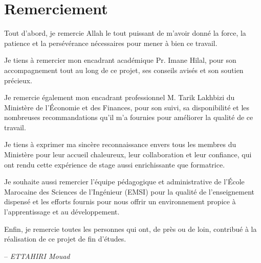 \chapter*{Remerciement}
\adjustmtc
\thispagestyle{MyStyle}

Tout d'abord, je remercie Allah le tout puissant de m'avoir donné la force, la patience et la persévérance nécessaires pour mener à bien ce travail.

Je tiens à remercier mon encadrant académique Pr. Imane Hilal, pour son accompagnement tout au long de ce projet, ses conseils avisés et son soutien précieux.

Je remercie également mon encadrant professionnel M. Tarik Lakhbizi du Ministère de l'Économie et des Finances, pour son suivi, sa disponibilité et les nombreuses recommandations qu'il m'a fournies pour améliorer la qualité de ce travail.

Je tiens à exprimer ma sincère reconnaissance envers tous les membres du Ministère pour leur accueil chaleureux, leur collaboration et leur confiance, qui ont rendu cette expérience de stage aussi enrichissante que formatrice.

Je souhaite aussi remercier l'équipe pédagogique et administrative de l'École Marocaine des Sciences de l'Ingénieur (EMSI) pour la qualité de l'enseignement dispensé et les efforts fournis pour nous offrir un environnement propice à l'apprentissage et au développement.

Enfin, je remercie toutes les personnes qui ont, de près ou de loin, contribué à la réalisation de ce projet de fin d'études.

\begin{flushright}
-- \textit{ETTAHIRI Mouad}
\end{flushright}
